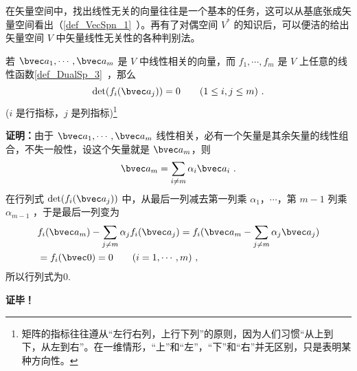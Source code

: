 
\begin{issues}
\end{issues}

在矢量空间中，找出线性无关的向量往往是一个基本的任务，这可以从基底张成矢量空间看出（\autoref{def_VecSpn_1}~）。再有了对偶空间 $V^*$ 的知识后，可以便洁的给出矢量空间 $V$ 中矢量线性无关性的各种判别法。
\begin{lemma}{}\label{lem_LinInD_1}
若 $\bvec a_1,\cdots,\bvec a_m$ 是 $V$ 中线性相关的向量，而 $f_1,\cdots,f_m$ 是 $V$ 上任意的线性函数\autoref{def_DualSp_3}~，那么
\begin{equation}
\det(f_i(\bvec a_j))=0\qquad (1\leq i,j\leq m)~.
\end{equation}
($i$ 是行指标，$j$ 是列指标)\footnote{矩阵的指标往往遵从“左行右列，上行下列”的原则，因为人们习惯“从上到下，从左到右”。在一维情形，“上”和“左”，“下”和“右”并无区别，只是表明某种方向性。}
\end{lemma}
\textbf{证明：}由于 $\bvec a_1,\cdots,\bvec a_m$ 线性相关，必有一个矢量是其余矢量的线性组合，不失一般性，设这个矢量就是 $\bvec a_m$，则
\begin{equation}
\bvec a_m=\sum_{i\neq m}\alpha_i\bvec a_i~.
\end{equation}
在行列式 $\det(f_i(\bvec a_j))$ 中，从最后一列减去第一列乘 $\alpha_1$，$\cdots$，第 $m-1$ 列乘 $\alpha_{m-1}$ ，于是最后一列变为
\begin{equation}
\begin{aligned}
&f_i(\bvec a_m)-\sum_{j\neq m}\alpha_j f_i(\bvec a_j)=f_i(\bvec a_m-\sum_{j\neq m}\alpha_{j}\bvec a_j)\\
&=f_i(\bvec 0)=0 \qquad (i=1,\cdots ,m)~,
\end{aligned}
\end{equation}
所以行列式为0.

\textbf{证毕！}

